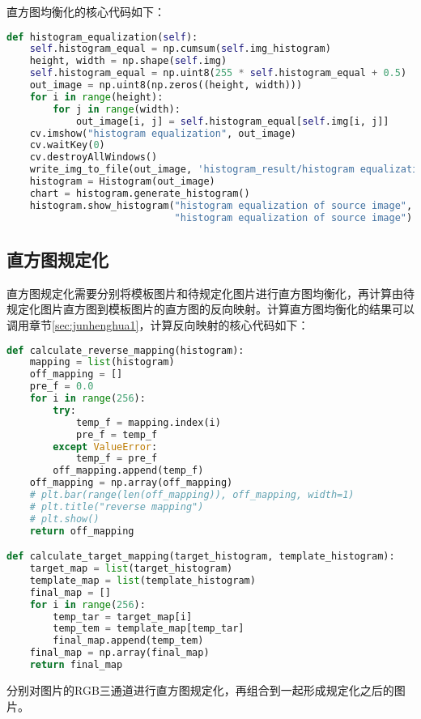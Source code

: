\documentclass{hitreport}
\begin{document}
直方图均衡化的核心代码如下：
\begin{lstlisting}[language=python]
def histogram_equalization(self):
	self.histogram_equal = np.cumsum(self.img_histogram)
    height, width = np.shape(self.img)
    self.histogram_equal = np.uint8(255 * self.histogram_equal + 0.5)
    out_image = np.uint8(np.zeros((height, width)))
    for i in range(height):
        for j in range(width):
            out_image[i, j] = self.histogram_equal[self.img[i, j]]
    cv.imshow("histogram equalization", out_image)
    cv.waitKey(0)
    cv.destroyAllWindows()
    write_img_to_file(out_image, 'histogram_result/histogram equalization of source image')
    histogram = Histogram(out_image)
    chart = histogram.generate_histogram()
    histogram.show_histogram("histogram equalization of source image", '../data/histogram_result/',
                             "histogram equalization of source image")
\end{lstlisting}

\subsection{直方图规定化}\label{sec:guidinghua1}

直方图规定化需要分别将模板图片和待规定化图片进行直方图均衡化，再计算由待规定化图片直方图到模板图片的直方图的反向映射。计算直方图均衡化的结果可以调用章节\ref{sec:junhenghua1}，计算反向映射的核心代码如下：
\begin{lstlisting}[language=python]
def calculate_reverse_mapping(histogram):
    mapping = list(histogram)
    off_mapping = []
    pre_f = 0.0
    for i in range(256):
        try:
            temp_f = mapping.index(i)
            pre_f = temp_f
        except ValueError:
            temp_f = pre_f
        off_mapping.append(temp_f)
    off_mapping = np.array(off_mapping)
    # plt.bar(range(len(off_mapping)), off_mapping, width=1)
    # plt.title("reverse mapping")
    # plt.show()
    return off_mapping

def calculate_target_mapping(target_histogram, template_histogram):
    target_map = list(target_histogram)
    template_map = list(template_histogram)
    final_map = []
    for i in range(256):
        temp_tar = target_map[i]
        temp_tem = template_map[temp_tar]
        final_map.append(temp_tem)
    final_map = np.array(final_map)
    return final_map
\end{lstlisting}

分别对图片的RGB三通道进行直方图规定化，再组合到一起形成规定化之后的图片。
\end{document}
